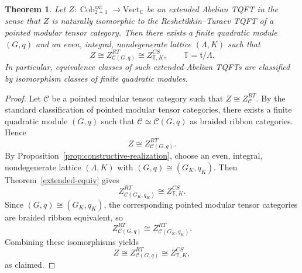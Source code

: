 \documentclass[12pt]{amsart}
\numberwithin{equation}{section}
\newtheorem{theorem}{Theorem}[section]
\DeclareMathOperator{\Cob}{Cob}
\begin{document}
\begin{theorem}
Let $Z:\Cob^{\mathrm{ext}}_{2+1}\longrightarrow \mathrm{Vect}_{\mathbb C}$ be an extended Abelian TQFT in the sense that $Z$ is naturally isomorphic to
the Reshetikhin--Turaev TQFT of a pointed modular
tensor category. Then there exists a finite quadratic module $(G,q)$ and an
even, integral, nondegenerate lattice $(\Lambda,K)$ such that
\[
Z \cong Z^{RT}_{\mathcal C(G,q)}
\cong Z^{CS}_{\mathbb T,K},
\qquad
\mathbb T=\mathfrak t/\Lambda.
\]
In particular, equivalence classes of such extended Abelian TQFTs are classified
by isomorphism classes of finite quadratic modules.
\end{theorem}

\begin{proof}
Let $\mathcal C$ be a pointed modular tensor category such that $Z\cong Z^{RT}_{\mathcal C}.$
By the standard classification of pointed modular tensor categories, there
exists a finite quadratic module $(G,q)$ such that
$\mathcal C \simeq \mathcal C(G,q)$ as braided ribbon categories. Hence
\[
Z\cong Z^{RT}_{\mathcal C(G,q)}.
\]
By Proposition~\ref{prop:constructive-realization}, choose an even, integral, nondegenerate lattice
$(\Lambda,K)$ with $(G,q)\cong (G_K,q_K)$. Then Theorem~\ref{extended-equiv} gives
\[
Z^{RT}_{\mathcal C(G_K,q_K)}\cong Z^{CS}_{\mathbb T,K}.
\]
Since $(G,q)\cong (G_K,q_K)$, the corresponding pointed modular tensor
categories are braided ribbon equivalent, so
\[
Z^{RT}_{\mathcal C(G,q)}\cong Z^{RT}_{\mathcal C(G_K,q_K)}.
\]
Combining these isomorphisms yields
\[
Z\cong Z^{RT}_{\mathcal C(G,q)}\cong Z^{CS}_{\mathbb T,K},
\]
as claimed.
\end{proof}
\end{document}
